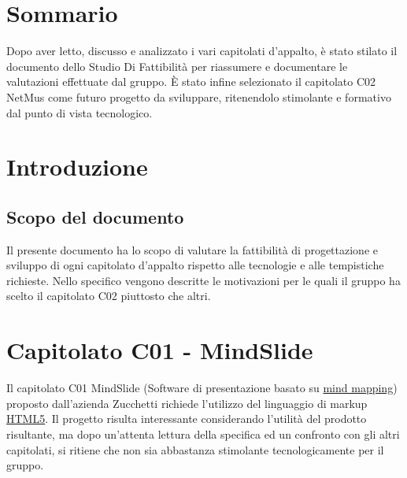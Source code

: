 \tableofcontents
\thispagestyle{fancy} %


\chapter*{Sommario}
\thispagestyle{fancy} %
Dopo aver letto, discusso e analizzato i vari capitolati d'appalto, \`e
stato stilato il documento dello Studio Di Fattibilit\`a per riassumere e
documentare le valutazioni effettuate dal gruppo. \`E stato infine selezionato
il capitolato C02 NetMus come futuro progetto da sviluppare, ritenendolo
stimolante e formativo dal punto di vista tecnologico.


\chapter{Introduzione}
\thispagestyle{fancy} %

\section{Scopo del documento}
Il presente documento ha lo scopo di valutare la fattibilit\`a di progettazione
e sviluppo di ogni capitolato d'appalto rispetto alle tecnologie e alle
tempistiche richieste. Nello specifico vengono descritte le motivazioni per le
quali il gruppo ha scelto il capitolato C02 piuttosto che altri.




\chapter{Capitolato C01 - MindSlide}
\thispagestyle{fancy}
Il capitolato C01 MindSlide (Software di presentazione basato su \underline{mind
mapping}) proposto dall'azienda Zucchetti richiede l'utilizzo del linguaggio di
markup \underline{HTML5}.
Il progetto risulta interessante considerando l'utilit\`a del prodotto
risultante, ma dopo un'attenta lettura della specifica ed un confronto con gli
altri capitolati, si ritiene che non sia abbastanza stimolante tecnologicamente
per il gruppo.

